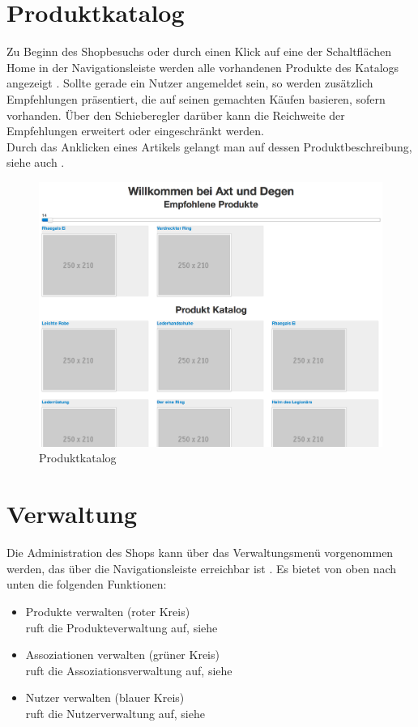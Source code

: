 \section{Produktkatalog}
Zu Beginn des Shopbesuchs oder durch einen Klick auf eine der Schaltflächen Home in der Navigationsleiste werden alle vorhandenen Produkte des Katalogs angezeigt . Sollte gerade ein Nutzer angemeldet sein, so werden zusätzlich Empfehlungen prä\-sen\-tiert, die auf seinen gemachten Käufen basieren, sofern vorhanden. Über den Schieberegler darüber kann die Reichweite der Empfehlungen erweitert oder eingeschränkt werden. \\
Durch das Anklicken eines Artikels gelangt man auf dessen Produktbeschreibung, siehe auch .

\begin{figure}[h!]
  \centering
  \includegraphics[width=\textwidth]{img/Produktkatalog.png}
  \caption{Produktkatalog}
  \label{fig:Produktkatalog}
\end{figure}


\section{Verwaltung}
\label{sec:Verwaltung}
Die Administration des Shops kann über das Verwaltungsmenü vorgenommen werden, das über die Navigationsleiste erreichbar ist . Es bietet von oben nach unten die folgenden Funktionen:
\begin{itemize}
  \item Produkte verwalten (roter Kreis) \\
        ruft die Produkteverwaltung auf, siehe 
  \vspace*{-0.5em}
  \item Assoziationen verwalten (grüner Kreis) \\
        ruft die Assoziationsverwaltung auf, siehe 
  \vspace*{-0.5em}
  \item Nutzer verwalten (blauer Kreis) \\
        ruft die Nutzerverwaltung auf, siehe 
\end{itemize}

